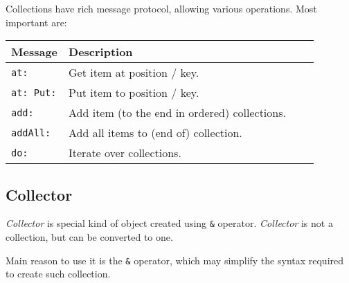 \documentclass[10pt]{article}
\begin{document}
\begin{multicols*}{3}
\vspace*{0.4cm}

Collections have rich message protocol, allowing various operations. Most important are:


\vspace*{0.2cm}
\small{\begin{tabular}{ p{50pt} p{180pt} l l }
Message & Description
\\\hline\hline

\texttt{at:}
&
Get item at position / key.
\\\hline %

\texttt{at: Put:}
&
Put item to position / key.
\\\hline %

\texttt{add:}
&
Add item (to the end in ordered) collections.
\\\hline %

\texttt{addAll:}
&
Add all items to (end of) collection.
\\\hline %

\texttt{do:}
&
Iterate over collections.
\\ %
\end{tabular}}



\subsection{Collector}

\textit{Collector} is special kind of object created using \texttt{\&} operator. \textit{Collector} is not a collection, but can be converted to one.

Main reason to use it is the \texttt{\&} operator, which may simplify the syntax required to create such collection.


\end{multicols*}
\end{document}
